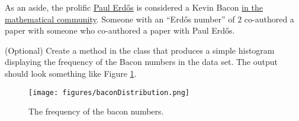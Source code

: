 As an aside, the prolific \href{https://en.wikipedia.org/wiki/Erd%C5%91s_number}{Paul Erd\H{o}s} is considered a Kevin Bacon \href{https://xkcd.com/599/}{in the mathematical community}.
Someone with an ``Erd\H{o}s number'' of $2$ co-authored a paper with someone who co-authored a paper with Paul Erd\H{o}s.

\begin{problem}
(Optional) Create a  method in the  class that produces a simple histogram displaying the frequency of the Bacon numbers in the data set.
The output should look something like Figure \ref{fig:bacon_numbers}.
\begin{figure}[H]
\texttt{[image: figures/baconDistribution.png]}
\caption{The frequency of the bacon numbers.}
\label{fig:bacon_numbers}
\end{figure}
\end{problem}



